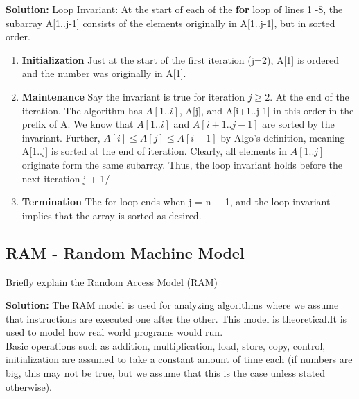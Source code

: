 \documentclass[11pt,fleqn]{book}
\begin{document}
\textbf{Solution:}
Loop Invariant: At the start of each of the \textbf{for} loop of lines 1 -8, the subarray A[1..j-1] consists of the elements originally in A[1..j-1], but in sorted order. 
\begin{enumerate}
    \item \textbf{Initialization} Just at the start of the first iteration (j=2), A[1] is ordered and the number was originally in A[1].
    \item \textbf{Maintenance} Say the invariant is true for iteration $j \geq 2$. At the end of the iteration. The algorithm has $A[1..i]$, A[j], and A[i+1..j-1] in this order in the prefix of A. We know that $A[1..i]$ and $A[i + 1..j-1]$ are sorted by the invariant. Further, $A[i] \leq A[j] \leq A[i + 1]$ by Algo's definition, meaning A[1..j] is sorted at the end of iteration. Clearly, all elements in $A[1..j]$ originate form the same subarray. Thus, the loop invariant holds before the next iteration j + 1/ 
    \item \textbf{Termination} The for loop ends when j = n + 1, and the loop invariant implies that the array is sorted as desired. 
\end{enumerate}
\subsection{RAM - Random Machine Model} 
\begin{example}
Briefly explain the Random Access Model (RAM)
\end{example}
\textbf{Solution:}
The RAM model is used for analyzing algorithms where we assume  that instructions are executed one after the other. This model is theoretical.It is used to model how real world programs would run.\\
Basic operations such as addition, multiplication, load, store,
copy, control, initialization are assumed to take a constant
amount of time each (if numbers are big, this may not be true,
but we assume that this is the case unless stated otherwise).
\end{document}
